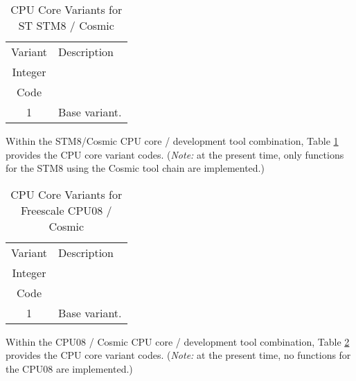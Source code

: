 \begin{table}
\caption{CPU Core Variants for ST STM8 / Cosmic}
\label{tbl:ciov0:sscv0:02}
\begin{center}
\begin{tabular}{|c|l|}
\hline
Variant           & Description                                                              \\
Integer           &                                                                          \\
Code              &                                                                          \\
\hline
\hline
1                 & Base variant.                                                            \\
\hline
\end{tabular}
\end{center}
\end{table}

Within the STM8/Cosmic CPU core / development tool combination, 
Table \ref{tbl:ciov0:sscv0:02} provides the CPU core variant codes.
(\emph{Note:}
at the present time, only functions for the STM8 using the Cosmic tool chain
are implemented.)

\begin{table}
\caption{CPU Core Variants for Freescale CPU08 / Cosmic}
\label{tbl:ciov0:sscv0:03}
\begin{center}
\begin{tabular}{|c|l|}
\hline
Variant           & Description                                                              \\
Integer           &                                                                          \\
Code              &                                                                          \\
\hline
\hline
1                 & Base variant.                                                            \\
\hline
\end{tabular}
\end{center}
\end{table}

Within the CPU08 / Cosmic CPU core / development tool combination, 
Table \ref{tbl:ciov0:sscv0:03} provides the CPU core variant codes.
(\emph{Note:}  at the present time, no functions for the CPU08 are
implemented.)


